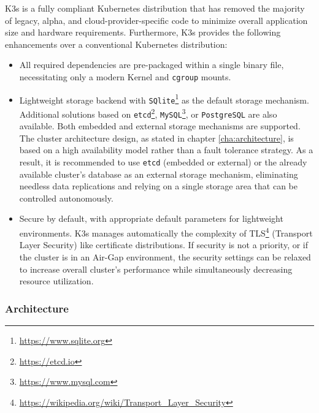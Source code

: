 K3s is a fully compliant Kubernetes distribution that has removed the majority of
legacy, alpha, and cloud-provider-specific code to minimize overall application size
and hardware requirements. Furthermore, K3s provides the following enhancements over
a conventional Kubernetes distribution\cite{k3s_enhancements}:
\begin{itemize}
  \item All required dependencies are pre-packaged within a single binary file,
    necessitating only a modern Kernel and \texttt{cgroup} mounts.

  \item Lightweight storage backend with \texttt{SQlite}\footnote{\url{https://www.sqlite.org}}
    as the default storage mechanism. Additional solutions based on \texttt{etcd}\footnote{\url{https://etcd.io}},
    \texttt{MySQL}\footnote{\url{https://www.mysql.com}}, or \texttt{PostgreSQL}
    are also available. Both embedded and external storage mechanisms are supported.
    \newline
    The cluster architecture design, as stated in chapter \ref{cha:architecture},
    is based on a high availability model rather than a fault tolerance strategy.
    As a result, it is recommended to use \texttt{etcd} (embedded or external) or
    the already available cluster's database as an external storage mechanism,
    eliminating needless data replications and relying on a single storage area
    that can be controlled autonomously.

  \item Secure by default, with appropriate default parameters for lightweight
    environments. K3s manages automatically the complexity of TLS\footnote{\url{https://wikipedia.org/wiki/Transport_Layer_Security}}
    (Transport Layer Security) like certificate distributions.
    \newline
    If security is not a priority, or if the cluster is in an Air-Gap environment,
    the security settings can be relaxed to increase overall cluster's
    performance while simultaneously decreasing resource utilization.
\end{itemize}

\subsubsection{Architecture}
\label{subsubsec:implementation_dependencies_k3s_architecture}

